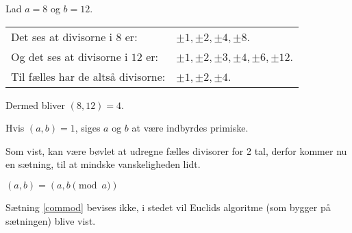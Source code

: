     \begin{eks}
        Lad \(a = 8\) og \(b = 12\).\\
        \begin{tabular*}{\textwidth}{@{} l l}
            Det ses at divisorne i \(8\) er: & \(\pm 1, \pm 2, \pm 4, \pm 8\).\\
            Og det ses at divisorne i \(12\) er:  &\(\pm 1, \pm 2, \pm 3, \pm 4, \pm 6, \pm 12\).\\
            Til fælles har de altså divisorne: & \(\pm 1, \pm 2, \pm 4\).
        \end{tabular*}

        Dermed bliver \((8, 12) = 4\).
    \end{eks}


    \begin{definition}
        Hvis \((a, b) = 1\), siges \(a\) og \(b\) at være indbyrdes primiske.
    \end{definition}

    Som vist, kan være bøvlet at udregne fælles divisorer for 2 tal, derfor kommer nu en sætning, til at mindske vanskeligheden lidt.

    \begin{sent}
        \label{commod}
        \((a, b) = (a, b \pmod{a})\)
    \end{sent}

    Sætning \ref{commod} bevises ikke, i stedet vil Euclids algoritme (som bygger på sætningen) blive vist.

